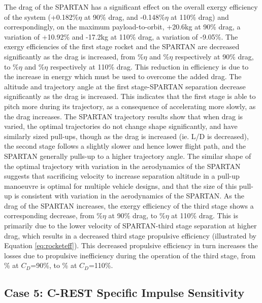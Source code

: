 The drag of the SPARTAN has a significant effect on the overall exergy efficiency of the system (+0.182\%$\eta$ at 90\% drag, and -0.148\%$\eta$ at 110\% drag) and correspondingly, on the maximum payload-to-orbit, +20.6kg at 90\% drag, a variation of +10.92\% and -17.2kg at 110\% drag, a variation of -9.05\%. The exergy efficiencies of the first stage rocket and the SPARTAN are decreased significantly as the drag is increased, from \firstExergyEffCdNinetyNoReturn\%$\eta$ and \secondExergyEffCdNinetyNoReturn\%$\eta$ respectively at 90\% drag, to \firstExergyEffCdOneHundredTenNoReturn\%$\eta$ and \secondExergyEffCdOneHundredTenNoReturn\%$\eta$ respectively at 110\% drag. This reduction in efficiency is due to the increase in energy which must be used to overcome the added drag. 
The altitude and trajectory angle at the first stage-SPARTAN separation decrease significantly as the drag is increased. This indicates that the first stage is able to pitch more during its trajectory, as a consequence of accelerating more slowly, as the drag increases.
The SPARTAN trajectory results show that when drag is varied, the optimal trajectories do not change shape significantly, and have similarly sized pull-ups, though as the drag is increased (ie. L/D is decreased), the second stage follows a slightly slower and hence lower flight path, and the SPARTAN generally pulls-up to a higher trajectory angle. The similar shape of the optimal trajectory with variation in the aerodynamics of the SPARTAN suggests that sacrificing velocity to increase separation altitude in a pull-up manoeuvre is optimal for multiple vehicle designs, and that the size of this pull-up is consistent with variation in the aerodynamics of the SPARTAN.
As the drag of the SPARTAN increases, the exergy efficiency of the third stage shows a corresponding decrease, from \thirddExergyEffCdNinetyNoReturn\%$\eta$ at 90\% drag, to \thirddExergyEffCdOneHundredTenNoReturn\%$\eta$ at 110\% drag.
This is primarily due to the lower velocity of SPARTAN-third stage separation at higher drag, which results in a decreased third stage propulsive efficiency (illustrated by Equation \ref{eq:rocketeff}). This decreased propulsive efficiency in turn increases the losses due to propulsive inefficiency during the operation of the third stage, from \PlossthreeCombinedCdNinetyNoReturn\% at $C_D$=90\%, to \PlossthreeCombinedCdOneHundredTenNoReturn\% at $C_D$=110\%.


\subsection{Case 5: C-REST Specific Impulse Sensitivity}\label{sec:ispsensitivitynoflyback}

